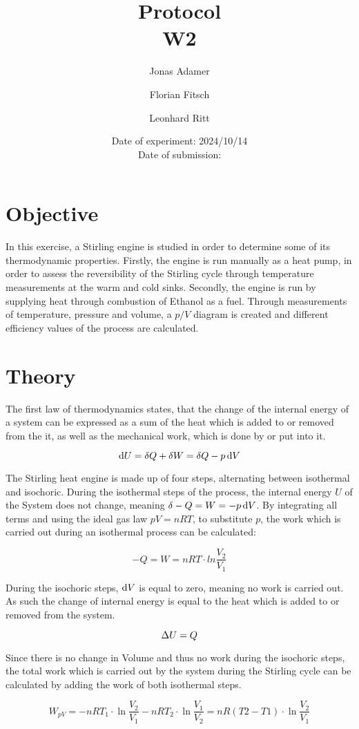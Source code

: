 \documentclass{article}
\title{Protocol \\ W2}
\author{Jonas Adamer \and Florian Fitsch \and Leonhard Ritt}
\date{Date of experiment: 2024/10/14\\Date of submission:}
\begin{document}
\clearpage
\maketitle
\thispagestyle{empty}

\newpage
\tableofcontents
\thispagestyle{empty}


\newpage
\section{Objective}
In this exercise, a Stirling engine is studied in order to determine some of its thermodynamic properties. Firstly, the engine is run manually as a heat pump, in order to assess the reversibility of the Stirling cycle through temperature measurements at the warm and cold sinks. Secondly, the engine is run by supplying heat through combustion of Ethanol as a fuel. Through measurements of temperature, pressure and volume, a \(p/V\) diagram is created and different efficiency values of the process are calculated.


\section{Theory}
The first law of thermodynamics states, that the change of the internal energy of a system can be expressed as a sum of the heat which is added to or removed from the it, as well as the mechanical work, which is done by or put into it.

\begin{equation}
    \odif U = \fdif Q + \fdif W = \fdif Q - p \odif V
\end{equation}

The Stirling heat engine is made up of four steps, alternating between isothermal and isochoric. During the isothermal steps of the process, the internal energy \(U\) of the System does not change, meaning \(\fdif -Q = W = -p \odif V\). By integrating all terms and using the ideal gas law \(pV = nRT\), to substitute \(p\), the work which is carried out during an isothermal process can be calculated:

\begin{equation}
    -Q = W = nRT \cdot ln \frac{V_2}{V_1}
\end{equation}

During the isochoric steps, \(\odif V\) is equal to zero, meaning no work is carried out. As such the change of internal energy is equal to the heat which is added to or removed from the system.

\begin{equation}
    \adif U = Q
\end{equation}

Since there is no change in Volume and thus no work during the isochoric steps, the total work which is carried out by the system during the Stirling cycle can be calculated by adding the work of both isothermal steps.

\begin{equation}
    W_{pV} = - nRT_1 \cdot \ln{\frac{V_2}{V_1}} - nRT_2 \cdot \ln{\frac{V_1}{V_2}} = nR(T2-T1) \cdot \ln{\frac{V_2}{V_1}}
\end{equation}

\printbibliography
\end{document}
